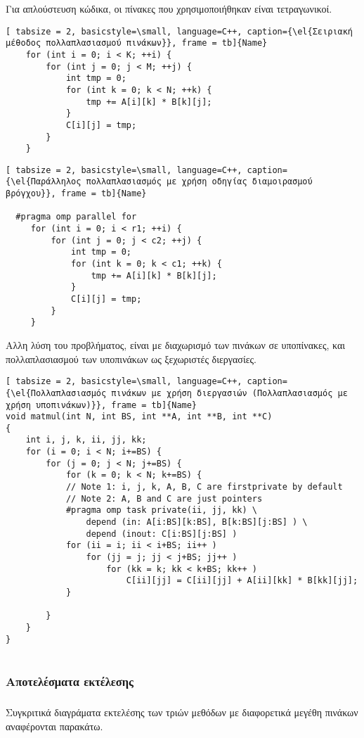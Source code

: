 Για απλούστευση κώδικα, οι πίνακες που χρησιμοποιήθηκαν είναι τετραγωνικοί.

\begin{lstlisting}[ tabsize = 2, basicstyle=\small, language=C++, caption={\el{Σειριακή μέθοδος πολλαπλασιασμού πινάκων}}, frame = tb]{Name}
    for (int i = 0; i < K; ++i) {
        for (int j = 0; j < M; ++j) {
            int tmp = 0;
            for (int k = 0; k < N; ++k) {
                tmp += A[i][k] * B[k][j];
            }
            C[i][j] = tmp;
        }
    }
\end{lstlisting}

\begin{lstlisting}[ tabsize = 2, basicstyle=\small, language=C++, caption={\el{Παράλληλος πολλαπλασιασμός με χρήση οδηγίας διαμοιρασμού βρόγχου}}, frame = tb]{Name}

  #pragma omp parallel for
     for (int i = 0; i < r1; ++i) {
         for (int j = 0; j < c2; ++j) {
             int tmp = 0;
             for (int k = 0; k < c1; ++k) {
                 tmp += A[i][k] * B[k][j];
             }
             C[i][j] = tmp;
         }
     }
\end{lstlisting}
Αλλη λύση του προβλήματος, είναι με διαχωρισμό των πινάκων σε υποπίνακες, και πολλαπλασιασμού των υποπινάκων ως ξεχωριστές διεργασίες\cite{examplesopm45}.

\begin{lstlisting}[ tabsize = 2, basicstyle=\small, language=C++, caption={\el{Πολλαπλασιασμός πινάκων με χρήση διεργασιών (Πολλαπλασιασμός με χρήση υποπινάκων)}}, frame = tb]{Name}
void matmul(int N, int BS, int **A, int **B, int **C)
{
	int i, j, k, ii, jj, kk;
	for (i = 0; i < N; i+=BS) {
    	for (j = 0; j < N; j+=BS) {
        	for (k = 0; k < N; k+=BS) {
			// Note 1: i, j, k, A, B, C are firstprivate by default
			// Note 2: A, B and C are just pointers
			#pragma omp task private(ii, jj, kk) \
            	depend (in: A[i:BS][k:BS], B[k:BS][j:BS] ) \
            	depend (inout: C[i:BS][j:BS] )
			for (ii = i; ii < i+BS; ii++ )
				for (jj = j; jj < j+BS; jj++ )
					for (kk = k; kk < k+BS; kk++ )
						C[ii][jj] = C[ii][jj] + A[ii][kk] * B[kk][jj];
            }
        
        }
    }
}


\end{lstlisting}

\clearpage

\subsubsection{ Αποτελέσματα εκτέλεσης}
\subparagraph{}
Συγκριτικά διαγράματα εκτελέσης των τριών μεθόδων με διαφορετικά μεγέθη πινάκων αναφέρονται παρακάτω.

